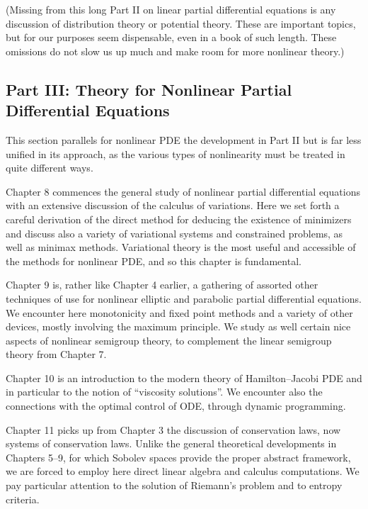 (Missing from this long Part II on linear partial differential equations is any discussion of distribution theory or potential theory. These are important topics, but for our purposes seem dispensable, even in a book of such length. These omissions do not slow us up much and make room for more nonlinear theory.) \subsection*{Part III: Theory for Nonlinear Partial Differential Equations} This section parallels for nonlinear PDE the development in Part II but is far less unified in its approach, as the various types of nonlinearity must be treated in quite different ways.

Chapter 8 commences the general study of nonlinear partial differential equations with an extensive discussion of the calculus of variations. Here we set forth a careful derivation of the direct method for deducing the existence of minimizers and discuss also a variety of variational systems and constrained problems, as well as minimax methods. Variational theory is the most useful and accessible of the methods for nonlinear PDE, and so this chapter is fundamental.

\par\Needspace{65mm}

Chapter 9 is, rather like Chapter 4 earlier, a gathering of assorted other techniques of use for nonlinear elliptic and parabolic partial differential equations. We encounter here monotonicity and fixed point methods and a variety of other devices, mostly involving the maximum principle. We study as well certain nice aspects of nonlinear semigroup theory, to complement the linear semigroup theory from Chapter 7.



Chapter 10 is an introduction to the modern theory of Hamilton--Jacobi PDE and in particular to the notion of ``viscosity solutions''. We encounter also the connections with the optimal control of ODE, through dynamic programming.

Chapter 11 picks up from Chapter 3 the discussion of conservation laws, now systems of conservation laws. Unlike the general theoretical developments in Chapters 5--9, for which Sobolev spaces provide the proper abstract framework, we are forced to employ here direct linear algebra and calculus computations. We pay particular attention to the solution of Riemann's problem and to entropy criteria.

